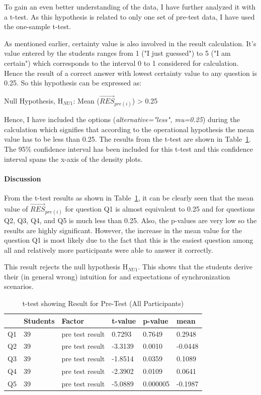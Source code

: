 To gain an even better understanding of the data, I have further analyzed it with a t-test. As this hypothesis is related to only one set of pre-test data, I have used the one-sample t-test.   

As mentioned earlier, certainty value is also involved in the result calculation. It's value entered by the students ranges from 1 ("I just guessed") to 5 ("I am certain") which corresponds to the interval 0 to 1 considered for calculation. Hence the result of a correct answer with lowest certainty value to any question is 0.25. So this hypothesis can be expressed as:   

Null Hypothesis, {H$_{NU1}$}: Mean ($\overrightarrow{\textit{RES}}$\textit{$_{pre(i)}$}) > 0.25 

Hence, I have included the options (\textit{alternative="less", mu=0.25}) during the calculation which signifies that according to the operational hypothesis the mean value has to be less than 0.25. The results from the t-test are shown in Table~\ref{tab:t-test_PreTest}. The 95\% confidence interval has been included for this t-test and this confidence interval spans the x-axis of the density plots.

\paragraph{Discussion}
From the t-test results as shown in Table~\ref{tab:t-test_PreTest}, it can be clearly seen that the mean value of $\overrightarrow{\textit{RES}}$\textit{$_{pre(i)}$} for question Q1 is almost equivalent to 0.25 and for questions Q2, Q3, Q4, and Q5 is much less than 0.25. Also, the p-values are very low so the results are highly significant. However, the increase in the mean value for the question Q1 is most likely due to the fact that this is the easiest question among all and relatively more participants were able to answer it correctly.

This result rejects the null hypothesis {H$_{NU1}$}. This shows that the students derive their (in general wrong) intuition for and expectations of synchronization scenarios.

\begin{table}[ht]
	\centering	
	\begin{tabular}{|p{1cm}|p{1.5cm}|p{4cm}|p{1.5cm}|p{1.5cm}|p{1.5cm}|}
		\hline
		\rowcolor[gray]{.8}	
		\textbf{} & \textbf{Students} & \textbf{Factor} & \textbf{t-value} & \textbf{p-value} & \textbf{mean}\\
		\hline
		Q1 & 39 & pre test result & 0.7293 & 0.7649 & 0.2948\\
		\hline
		Q2 & 39 & pre test result & -3.3139 & 0.0010 & -0.0448\\
		\hline
		Q3 & 39 & pre test result & -1.8514 & 0.0359 & 0.1089\\
		\hline	
		Q4 & 39 & pre test result & -2.3902 & 0.0109 & 0.0641\\
		\hline
		Q5 & 39 & pre test result & -5.0889 & 0.000005 & -0.1987\\
		\hline			
	\end{tabular}
	\caption{t-test showing Result for Pre-Test (All Participants)}
	\label{tab:t-test_PreTest}
\end{table}

